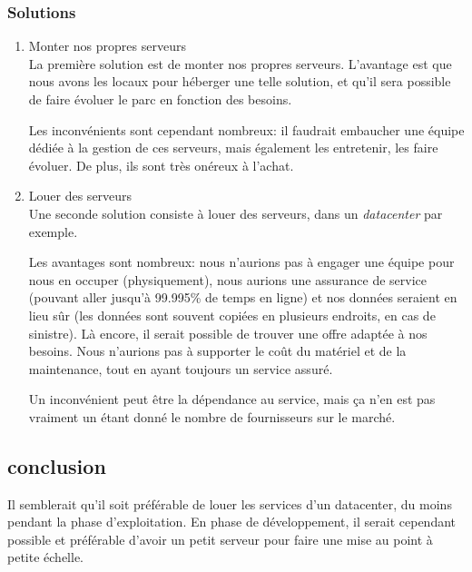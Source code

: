     \subsubsection{Solutions}
        \begin{enumerate}
            \item Monter nos propres serveurs\\
            La première solution est de monter nos propres serveurs.
            L'avantage est que nous avons les locaux pour héberger une telle solution, et qu'il sera possible de faire évoluer le parc en fonction des besoins.
    
            Les inconvénients sont cependant nombreux: il faudrait embaucher une équipe dédiée à la gestion de ces serveurs, mais également les entretenir,
            les faire évoluer. De plus, ils sont très onéreux à l'achat.\\

            \item Louer des serveurs\\
            Une seconde solution consiste à louer des serveurs, dans un \textsl{datacenter} par exemple.

            Les avantages sont nombreux: nous n'aurions pas à engager une équipe pour
            nous en occuper (physiquement), nous aurions une assurance de service
            (pouvant aller jusqu'à 99.995\% de temps en ligne) et nos données seraient
            en lieu sûr (les données sont souvent copiées en plusieurs endroits, en cas de sinistre). Là encore, il serait possible de trouver une offre adaptée à nos besoins. Nous n'aurions pas à supporter le coût du matériel et de la maintenance, tout en ayant toujours un service assuré.

            Un inconvénient peut être la dépendance au service, mais ça n'en est pas vraiment un étant donné le nombre de fournisseurs sur le marché.
        \end{enumerate}
    \subsection{conclusion}
    Il semblerait qu'il soit préférable de louer les services d'un datacenter, du moins pendant la phase d'exploitation. En phase de développement,
il serait cependant possible et préférable d'avoir un petit serveur pour faire une mise au point à petite échelle.
%
\vfill
\pagebreak
